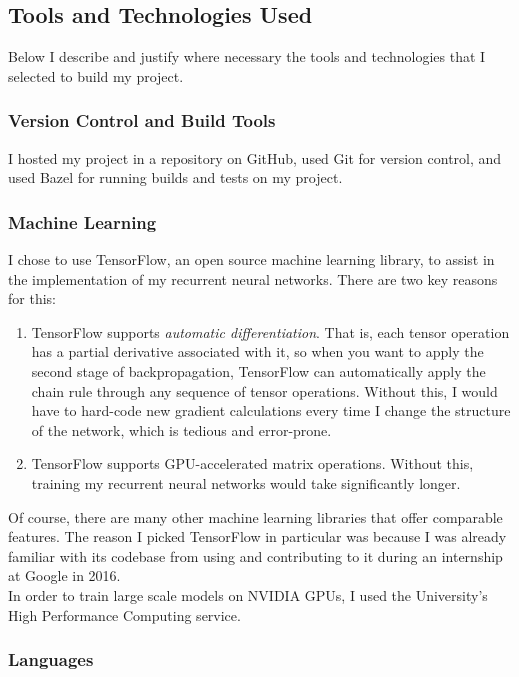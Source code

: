 \documentclass[a4paper, 12pt]{report}
\newcommand{\tit}[1]{\textit{#1}}
\begin{document}
\subsection{Tools and Technologies Used} \label{tools}

Below I describe and justify where necessary the tools and technologies that I selected to build my project.

\subsubsection{Version Control and Build Tools}

I hosted my project in a repository on GitHub, used Git for version control, and used Bazel for running builds and tests on my project.

\subsubsection{Machine Learning}

I chose to use TensorFlow, an open source machine learning library, to assist in the implementation of my recurrent neural networks. There are two key reasons for this:
\begin{enumerate}
\item
	TensorFlow supports \tit{automatic differentiation}. That is, each tensor operation has a partial derivative associated with it, so when you want to apply the second stage of backpropagation, TensorFlow can automatically apply the chain rule through any sequence of tensor operations. Without this, I would have to hard-code new gradient calculations every time I change the structure of the network, which is tedious and error-prone.
\item
	TensorFlow supports GPU-accelerated matrix operations. Without this, training my recurrent neural networks would take significantly longer.
\end{enumerate}
Of course, there are many other machine learning libraries that offer comparable features. The reason I picked TensorFlow in particular was because I was already familiar with its codebase from using and contributing to it during an internship at Google in 2016. \\

In order to train large scale models on NVIDIA GPUs, I used the University's High Performance Computing service.

\subsubsection{Languages}
\end{document}
